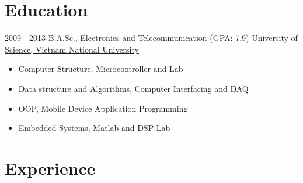 \documentclass[letterpaper]{twentysecondcv} %
\begin{document}
\makeprofile

\section{Education}

\begin{twenty} %
	\twentyitem
    	{2009 - 2013}
		{}
        {B.A.Sc., Electronics and Telecommunication \textnormal{(GPA: 7.9)}}
        {\href{http://www.hcmus.edu.vn}{University of Science, Vietnam National University}}
        {}
        {\begin{itemize}
        \item Computer Structure, Microcontroller and Lab
        \item Data structure and Algorithms, Computer Interfacing and DAQ
        \item OOP, Mobile Device Application Programming
        \item Embedded Systems, Matlab and DSP Lab
        \end{itemize}}
\end{twenty}


\section{Experience}
\end{document}
